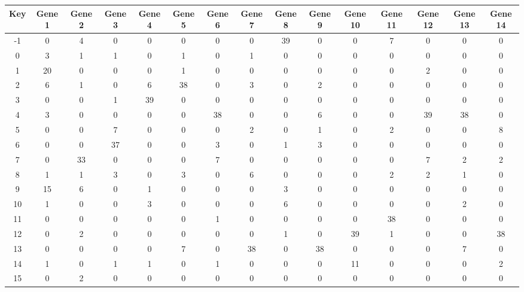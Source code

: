 \begin{tabular}{|c|c|c|c|c|c|c|c|c|c|c|c|c|c|c|}
\hline
Key & Gene 1 & Gene 2 & Gene 3 & Gene 4 & Gene 5 & Gene 6 & Gene 7 & Gene 8 & Gene 9 & Gene 10 & Gene 11 & Gene 12 & Gene 13 & Gene 14 \\
\hline
-1 & 0 & 4 & 0 & 0 & 0 & 0 & 0 & 39 & 0 & 0 & 7 & 0 & 0 & 0 \\
0 & 3 & 1 & 1 & 0 & 1 & 0 & 1 & 0 & 0 & 0 & 0 & 0 & 0 & 0 \\
1 & 20 & 0 & 0 & 0 & 1 & 0 & 0 & 0 & 0 & 0 & 0 & 2 & 0 & 0 \\
2 & 6 & 1 & 0 & 6 & 38 & 0 & 3 & 0 & 2 & 0 & 0 & 0 & 0 & 0 \\
3 & 0 & 0 & 1 & 39 & 0 & 0 & 0 & 0 & 0 & 0 & 0 & 0 & 0 & 0 \\
4 & 3 & 0 & 0 & 0 & 0 & 38 & 0 & 0 & 6 & 0 & 0 & 39 & 38 & 0 \\
5 & 0 & 0 & 7 & 0 & 0 & 0 & 2 & 0 & 1 & 0 & 2 & 0 & 0 & 8 \\
6 & 0 & 0 & 37 & 0 & 0 & 3 & 0 & 1 & 3 & 0 & 0 & 0 & 0 & 0 \\
7 & 0 & 33 & 0 & 0 & 0 & 7 & 0 & 0 & 0 & 0 & 0 & 7 & 2 & 2 \\
8 & 1 & 1 & 3 & 0 & 3 & 0 & 6 & 0 & 0 & 0 & 2 & 2 & 1 & 0 \\
9 & 15 & 6 & 0 & 1 & 0 & 0 & 0 & 3 & 0 & 0 & 0 & 0 & 0 & 0 \\
10 & 1 & 0 & 0 & 3 & 0 & 0 & 0 & 6 & 0 & 0 & 0 & 0 & 2 & 0 \\
11 & 0 & 0 & 0 & 0 & 0 & 1 & 0 & 0 & 0 & 0 & 38 & 0 & 0 & 0 \\
12 & 0 & 2 & 0 & 0 & 0 & 0 & 0 & 1 & 0 & 39 & 1 & 0 & 0 & 38 \\
13 & 0 & 0 & 0 & 0 & 7 & 0 & 38 & 0 & 38 & 0 & 0 & 0 & 7 & 0 \\
14 & 1 & 0 & 1 & 1 & 0 & 1 & 0 & 0 & 0 & 11 & 0 & 0 & 0 & 2 \\
15 & 0 & 2 & 0 & 0 & 0 & 0 & 0 & 0 & 0 & 0 & 0 & 0 & 0 & 0 \\
\hline
\end{tabular}